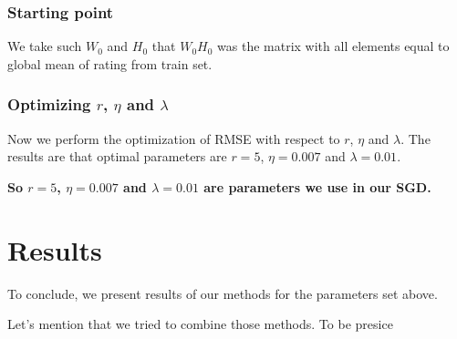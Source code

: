 \documentclass[10pt]{amsart}
\begin{document}
\subsubsection*{Starting point}
We take such $W_0$ and $H_0$ that $W_{0} H_0$ was the matrix with all elements equal to global mean of rating from train set.

\subsubsection*{Optimizing $r$, $\eta$ and $\lambda$}
Now we perform the optimization of RMSE with respect to $r$, $\eta$ and $\lambda$.
The results are that optimal parameters are $r=5$, $\eta = 0.007$ and $\lambda = 0.01$.

\textbf{So $r=5$, $\eta = 0.007$ and $\lambda = 0.01$ are parameters we use in our SGD.}






\section{Results}

To conclude, we present results of our methods for the parameters set above.


Let's mention that we tried to combine those methods.
To be presice
\end{document}
